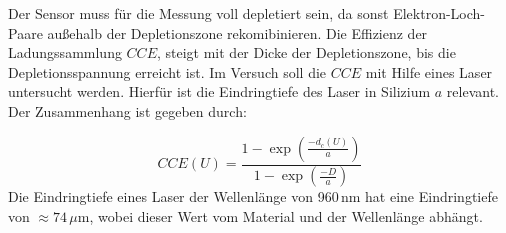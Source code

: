 Der Sensor muss für die Messung voll depletiert sein, da sonst Elektron-Loch-Paare
außehalb der Depletionszone rekomibinieren. Die Effizienz der Ladungssammlung
$CCE$, steigt mit der Dicke der Depletionszone, bis die Depletionsspannung erreicht ist.
Im Versuch soll die $CCE$ mit Hilfe eines Laser untersucht werden. Hierfür ist die
Eindringtiefe des Laser in Silizium $a$ relevant. Der Zusammenhang ist gegeben durch:

\begin{equation}
    \label{CCE}
    CCE(U)=\frac{1-\exp(\frac{-d_c(U)}{a})}{1-\exp(\frac{-D}{a})}
\end{equation}
Die Eindringtiefe eines Laser der Wellenlänge von 960$\,$nm hat eine Eindringtiefe
von $\approx 74\,\mu$m, wobei dieser Wert vom  Material und der Wellenlänge abhängt.
